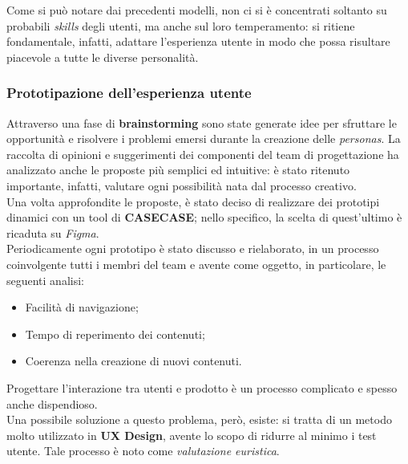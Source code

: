 \documentclass{natourDoc}
\begin{document}
Come si può notare dai precedenti modelli, non ci si è concentrati soltanto su probabili \textit{skills} degli utenti, ma anche sul loro
temperamento: si ritiene fondamentale, infatti, adattare l'esperienza utente in modo che possa risultare piacevole a tutte le diverse personalità.

\newpage
\subsubsection{Prototipazione dell'esperienza utente}
Attraverso una fase di \textbf{brainstorming} sono state generate idee per sfruttare le opportunità e risolvere i problemi emersi durante la creazione delle \textit{personas}.
La raccolta di opinioni e suggerimenti dei componenti del team di progettazione ha analizzato anche le proposte più semplici ed intuitive: è stato ritenuto importante, infatti, valutare ogni
possibilità nata dal processo creativo. \\
Una volta approfondite le proposte, è stato deciso di realizzare dei prototipi dinamici con un tool di \textbf{CASE\Gls{CASE}}; nello specifico, la scelta di quest'ultimo è ricaduta su \textit{Figma}.\\

Periodicamente ogni prototipo è stato discusso e rielaborato, in un processo coinvolgente tutti i membri del team e avente come oggetto, in particolare, le seguenti analisi:
\begin{itemize}
	\item Facilità di navigazione;
	\item Tempo di reperimento dei contenuti;
	\item Coerenza nella creazione di nuovi contenuti.
\end{itemize}

Progettare l'interazione tra utenti e prodotto è un processo complicato e spesso anche dispendioso. \\
Una possibile soluzione a questo problema, però, esiste: si tratta di un metodo molto utilizzato in
\textbf{UX Design}, avente lo scopo di ridurre al minimo i test utente. Tale processo è noto come \textit{valutazione euristica}. \\
\end{document}
